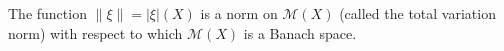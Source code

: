 The function $\|\xi\| = |\xi|(X)$ is a norm on $\mathcal{M}(X)$ (called the total variation norm) with respect to which $\mathcal{M}(X)$ is a Banach space.

